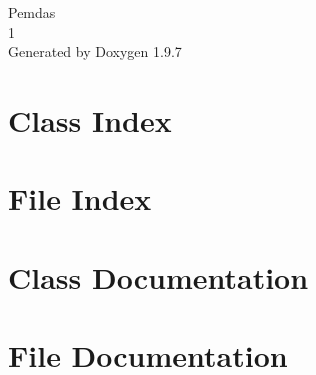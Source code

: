 \documentclass[twoside]{book}
\newcommand{\+}{\discretionary{\mbox{\scriptsize$\hookleftarrow$}}{}{}}
\newcommand{\clearemptydoublepage}{%
    \newpage{\pagestyle{empty}\cleardoublepage}%
  }
\begin{document}
  \raggedbottom
  \begin{titlepage}
  \vspace*{7cm}
  \begin{center}%
  {\Large Pemdas}\\
  [1ex]\large 1 \\
  \vspace*{1cm}
  {\large Generated by Doxygen 1.9.7}\\
  \end{center}
  \end{titlepage}
  \clearemptydoublepage
  \tableofcontents
  \clearemptydoublepage

\chapter{Class Index}

\chapter{File Index}

\chapter{Class Documentation}

\chapter{File Documentation}

  \backmatter
  \newpage
  \clearemptydoublepage
  \printindex
\end{document}
